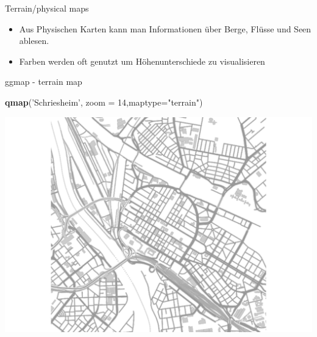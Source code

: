 \documentclass[ignorenonframetext,]{beamer}
\newenvironment{Shaded}{}{}
\newcommand{\KeywordTok}[1]{\textcolor[rgb]{0.00,0.44,0.13}{\textbf{{#1}}}}
\newcommand{\DataTypeTok}[1]{\textcolor[rgb]{0.56,0.13,0.00}{{#1}}}
\newcommand{\DecValTok}[1]{\textcolor[rgb]{0.25,0.63,0.44}{{#1}}}
\newcommand{\StringTok}[1]{\textcolor[rgb]{0.25,0.44,0.63}{{#1}}}
\newcommand{\NormalTok}[1]{{#1}}
\begin{document}
\begin{frame}{Terrain/physical maps}

\begin{itemize}
\item
  Aus Physischen Karten kann man Informationen über Berge, Flüsse und
  Seen ablesen.
\item
  Farben werden oft genutzt um Höhenunterschiede zu visualisieren
\end{itemize}

\end{frame}

\begin{frame}[fragile]{ggmap - terrain map}

\begin{Shaded}
\begin{Highlighting}[]
\KeywordTok{qmap}\NormalTok{(}\StringTok{'Schriesheim'}\NormalTok{, }\DataTypeTok{zoom =} \DecValTok{14}\NormalTok{,}\DataTypeTok{maptype=}\StringTok{"terrain"}\NormalTok{)}
\end{Highlighting}
\end{Shaded}

\includegraphics{R_intern_files/figure-beamer/unnamed-chunk-270-1.pdf}

\end{frame}
\end{document}
